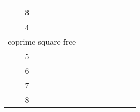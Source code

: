 \documentclass[12pt,english]{article}
\providecommand{\tabularnewline}{\\}
\theoremstyle{definition}
\theoremstyle{remark}
\theoremstyle{plain}
\theoremstyle{plain}
\begin{document}
\begin{table}[H]
\begin{tabular}{|c|c|c|c|c|c|c|c|c|}
\hline 
{\scriptsize 3} & \rule[-9pt]{0pt}{26pt} & \textsl{\footnotesize \negthinspace{}\negthinspace{}}\textsl{\footnotesize \negthinspace{}\negthinspace{}} & \textsl{\footnotesize \negthinspace{}\negthinspace{}}\textsl{\footnotesize \negthinspace{}\negthinspace{}} & \negthinspace{}\negthinspace{}\negthinspace{}\negthinspace{}\negthinspace{}\negthinspace{} & \negthinspace{}\negthinspace{}\negthinspace{}\negthinspace{}\negthinspace{}\negthinspace{} &  &  & \negthinspace{}\negthinspace{}\negthinspace{}\negthinspace{}\tabularnewline
\hline 
{\scriptsize 4} & \rule[-9pt]{0pt}{26pt} & \textsl{\footnotesize \negthinspace{}\negthinspace{}}\textsl{\footnotesize \negthinspace{}\negthinspace{}} & \textsl{\footnotesize \negthinspace{}\negthinspace{}}\textsl{\footnotesize \negthinspace{}\negthinspace{}} & \negthinspace{}\negthinspace{}\negthinspace{}\negthinspace{}\negthinspace{}\negthinspace{} & \negthinspace{}\negthinspace{}\negthinspace{}\negthinspace{}\negthinspace{}\negthinspace{} &  &  & \negthinspace{}\negthinspace{}\negthinspace{}\negthinspace{}\tabularnewline
\hline 
\multicolumn{2}{c|}{{\footnotesize coprime square free}} & \multicolumn{7}{c}{}\tabularnewline
\hline 
{\scriptsize 5} & \rule[-9pt]{0pt}{26pt} & \textsl{\footnotesize \negthinspace{}\negthinspace{}}\textsl{\footnotesize \negthinspace{}\negthinspace{}} & \textsl{\footnotesize \negthinspace{}\negthinspace{}}\textsl{\footnotesize \negthinspace{}\negthinspace{}} &  &  &  &  & \negthinspace{}\negthinspace{}\negthinspace{}\negthinspace{}\tabularnewline
\hline 
{\scriptsize 6} & \rule[-9pt]{0pt}{26pt} & \textsl{\footnotesize \negthinspace{}\negthinspace{}}\textsl{\footnotesize \negthinspace{}\negthinspace{}} & \textsl{\footnotesize \negthinspace{}\negthinspace{}}\textsl{\footnotesize \negthinspace{}\negthinspace{}} &  &  & \negthinspace{}\negthinspace{}\negthinspace{}\negthinspace{} &  & \negthinspace{}\negthinspace{}\negthinspace{}\negthinspace{}\tabularnewline
\hline 
{\scriptsize 7} & \rule[-9pt]{0pt}{26pt} & \textsl{\footnotesize \negthinspace{}\negthinspace{}}\textsl{\footnotesize \negthinspace{}\negthinspace{}} & \textsl{\footnotesize \negthinspace{}\negthinspace{}}\textsl{\footnotesize \negthinspace{}\negthinspace{}} &  &  & \negthinspace{}\negthinspace{}\negthinspace{}\negthinspace{} &  & \negthinspace{}\negthinspace{}\negthinspace{}\negthinspace{}\tabularnewline
\hline 
{\scriptsize 8} & \rule[-9pt]{0pt}{26pt} & \textsl{\footnotesize \negthinspace{}\negthinspace{}}\textsl{\footnotesize \negthinspace{}\negthinspace{}} & \textsl{\footnotesize \negthinspace{}\negthinspace{}}\textsl{\footnotesize \negthinspace{}\negthinspace{}} &  &  &  &  & \negthinspace{}\negthinspace{}\negthinspace{}\negthinspace{}\tabularnewline

\end{tabular}
\end{table}
\end{document}
